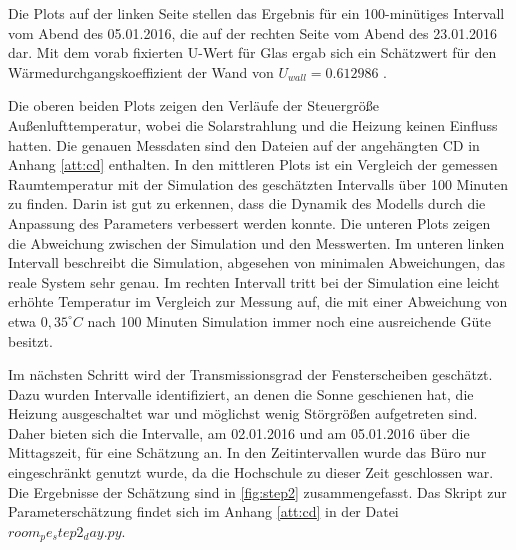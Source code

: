 Die Plots auf der linken Seite stellen das Ergebnis für ein 100-minütiges Intervall vom Abend des 05.01.2016, die auf der rechten Seite vom Abend des 23.01.2016 dar. Mit dem vorab fixierten U-Wert für Glas ergab sich ein Schätzwert für den Wärmedurchgangskoeffizient der Wand von $U_{wall}=0.612986$ .

Die oberen beiden Plots zeigen den Verläufe der Steuergröße Außenlufttemperatur, wobei die Solarstrahlung und die Heizung keinen Einfluss hatten. Die genauen Messdaten sind den Dateien auf der angehängten CD in Anhang \ref{att:cd} enthalten. In den mittleren Plots ist ein Vergleich der gemessen Raumtemperatur mit der Simulation des geschätzten Intervalls über 100 Minuten zu finden. Darin ist gut zu erkennen, dass die Dynamik des Modells durch die Anpassung des Parameters verbessert werden konnte. Die unteren Plots zeigen die Abweichung zwischen der Simulation und den Messwerten. Im unteren linken Intervall beschreibt die Simulation, abgesehen von minimalen Abweichungen, das reale System sehr genau. Im rechten Intervall tritt bei der Simulation eine leicht erhöhte Temperatur im Vergleich zur Messung auf, die mit einer Abweichung von etwa $0,35^{\circ}C$ nach 100 Minuten Simulation immer noch eine ausreichende Güte besitzt.

Im nächsten Schritt wird der Transmissionsgrad der Fensterscheiben geschätzt. Dazu wurden Intervalle identifiziert, an denen die Sonne geschienen hat, die Heizung ausgeschaltet war und möglichst wenig Störgrößen aufgetreten sind. Daher bieten sich die Intervalle, am 02.01.2016 und am 05.01.2016 über die Mittagszeit, für eine Schätzung an. In den Zeitintervallen wurde das Büro nur eingeschränkt genutzt wurde, da die Hochschule zu dieser Zeit geschlossen war. Die Ergebnisse der Schätzung sind in \ref{fig:step2} zusammengefasst. Das Skript zur Parameterschätzung findet sich im Anhang \ref{att:cd} in der Datei $room_pe_step2_day.py$.

